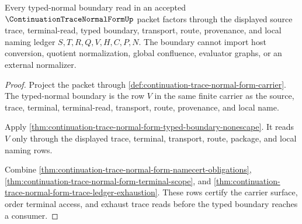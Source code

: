 \begin{theorem}
\label{thm:continuation-trace-normal-form-typed-boundary-ledger-nonescape}
Every typed-normal boundary read in an accepted $\ContinuationTraceNormalFormUp$ packet factors through the displayed source trace, terminal-read, typed boundary, transport, route, provenance, and local naming ledger $S,T,R,Q,V,H,C,P,N$. The boundary cannot import host conversion, quotient normalization, global confluence, evaluator graphs, or an external normalizer.
\end{theorem}
\begin{proof}
Project the packet through \autoref{def:continuation-trace-normal-form-carrier}. The typed-normal boundary is the row $V$ in the same finite carrier as the source, trace, terminal, terminal-read, transport, route, provenance, and local name.

Apply \autoref{thm:continuation-trace-normal-form-typed-boundary-nonescape}. It reads $V$ only through the displayed trace, terminal, transport, route, package, and local naming rows.

Combine \autoref{thm:continuation-trace-normal-form-namecert-obligations}, \autoref{thm:continuation-trace-normal-form-terminal-scope}, and \autoref{thm:continuation-trace-normal-form-trace-ledger-exhaustion}. These rows certify the carrier surface, order terminal access, and exhaust trace reads before the typed boundary reaches a consumer.
\end{proof}

